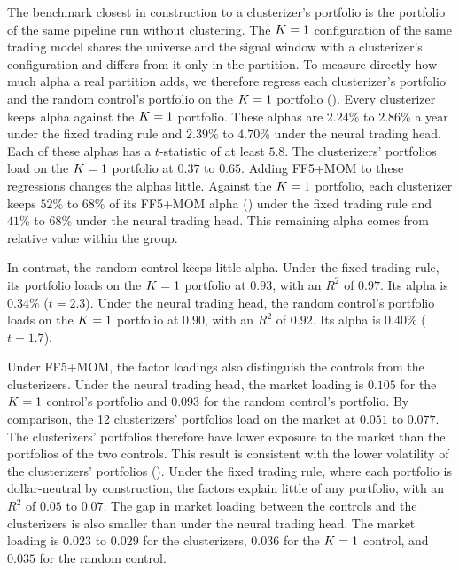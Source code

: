 The benchmark closest in construction to a clusterizer's portfolio is the portfolio of the same pipeline run without clustering. The $K=1$ configuration of the same trading model shares the universe and the signal window with a clusterizer's configuration and differs from it only in the partition. To measure directly how much alpha a real partition adds, we therefore regress each clusterizer's portfolio and the random control's portfolio on the $K=1$ portfolio (). Every clusterizer keeps alpha against the $K=1$ portfolio. These alphas are $2.24\%$ to $2.86\%$ a year under the fixed trading rule and $2.39\%$ to $4.70\%$ under the neural trading head. Each of these alphas has a $t$-statistic of at least $5.8$. The clusterizers' portfolios load on the $K=1$ portfolio at $0.37$ to $0.65$. Adding FF5+MOM to these regressions changes the alphas little. Against the $K=1$ portfolio, each clusterizer keeps $52\%$ to $68\%$ of its FF5+MOM alpha () under the fixed trading rule and $41\%$ to $68\%$ under the neural trading head. This remaining alpha comes from relative value within the group.

In contrast, the random control keeps little alpha. Under the fixed trading rule, its portfolio loads on the $K=1$ portfolio at $0.93$, with an $R^2$ of $0.97$. Its alpha is $0.34\%$ ($t = 2.3$). Under the neural trading head, the random control's portfolio loads on the $K=1$ portfolio at $0.90$, with an $R^2$ of $0.92$. Its alpha is $0.40\%$ ($t = 1.7$).




Under FF5+MOM, the factor loadings also distinguish the controls from the clusterizers. Under the neural trading head, the market loading is $0.105$ for the $K=1$ control's portfolio and $0.093$ for the random control's portfolio. By comparison, the 12 clusterizers' portfolios load on the market at $0.051$ to $0.077$. The clusterizers' portfolios therefore have lower exposure to the market than the portfolios of the two controls. This result is consistent with the lower volatility of the clusterizers' portfolios (). Under the fixed trading rule, where each portfolio is dollar-neutral by construction, the factors explain little of any portfolio, with an $R^2$ of $0.05$ to $0.07$. The gap in market loading between the controls and the clusterizers is also smaller than under the neural trading head. The market loading is $0.023$ to $0.029$ for the clusterizers, $0.036$ for the $K=1$ control, and $0.035$ for the random control.

